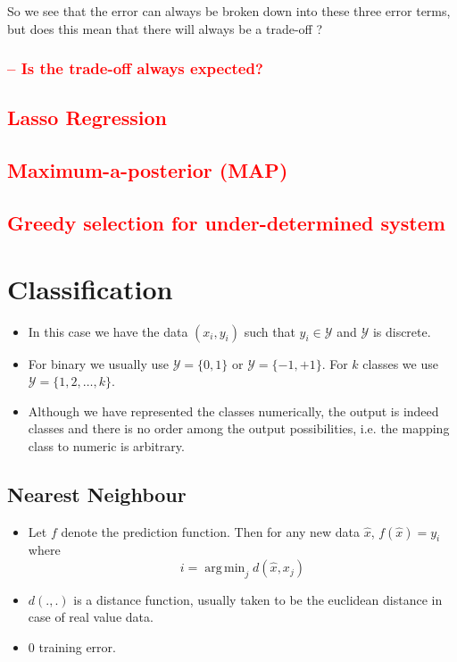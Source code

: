 \documentclass{article}
\DeclareMathOperator*{\argmin}{arg\,min}
\newcommand{\red}[1]{\textcolor{red}{#1}}
\newcommand{\hrfullline}{\noindent\makebox[\linewidth]{\rule{\paperwidth}{2pt}}}
\newcommand{\mcaly}{\mathcal{Y}}
\newcommand{\xhat}{\hat{x}}
\begin{document}
So we see that the error can always be broken down into these three error terms, but does this mean that there will always be a trade-off ?

\subsubsection{\red{-- Is the trade-off always expected?}} 

\subsection{\red{Lasso Regression}}
\subsection{\red{Maximum-a-posterior (MAP)}}
\subsection{\red{Greedy selection for under-determined system}}

\hrfullline

\section{Classification}

\begin{itemize}
    \item In this case we have the data $(x_i,y_i)$ such that $y_i \in \mcaly$ and $\mcaly$ is discrete.
    \item For binary we usually use $\mcaly=\{0,1\}$ or $\mcaly=\{-1, +1\}$. For $k$ classes we use $\mcaly = \{1,2,\dots,k\}$.
    \item Although we have represented the classes numerically, the output is indeed classes and there is no order among the output possibilities, i.e. the mapping class to numeric is arbitrary.
\end{itemize}

\subsection{Nearest Neighbour}
\begin{itemize}
    \item Let $f$ denote the prediction function. Then for any new data $\xhat$, $f(\xhat) = y_i$ where $$i=\argmin_j d(\xhat, x_j)$$
    \item $d(.,.)$ is a distance function, usually taken to be the euclidean distance in case of real value data.
    \item 0 training error.
\end{itemize}
\end{document}
